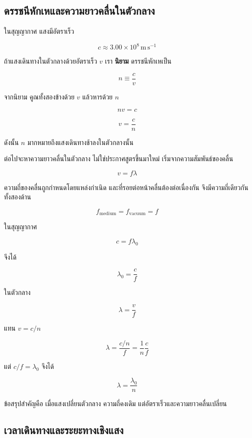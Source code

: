 \subsection{ดรรชนีหักเหและความยาวคลื่นในตัวกลาง}

ในสุญญากาศ แสงมีอัตราเร็ว

\[
c\approx 3.00\times10^8\,\mathrm{m\,s^{-1}}
\]

ถ้าแสงเดินทางในตัวกลางด้วยอัตราเร็ว $v$ เรา \textbf{นิยาม} ดรรชนีหักเหเป็น

\begin{tcolorbox}[title={นิยาม: ดรรชนีหักเห}]
\[
\boxed{n\equiv\frac{c}{v}}
\]
\end{tcolorbox}

จากนิยาม คูณทั้งสองข้างด้วย $v$ แล้วหารด้วย $n$

\[
nv=c
\]

\[
\boxed{v=\frac{c}{n}}
\]

ดังนั้น $n$ มากหมายถึงแสงเดินทางช้าลงในตัวกลางนั้น

ต่อไปจะหาความยาวคลื่นในตัวกลาง ไม่ใช่ประกาศสูตรขึ้นมาใหม่ เริ่มจากความสัมพันธ์ของคลื่น

\[
v=f\lambda
\]

ความถี่ของคลื่นถูกกำหนดโดยแหล่งกำเนิด และที่รอยต่อหน้าคลื่นต้องต่อเนื่องกัน จึงมีความถี่เดียวกันทั้งสองด้าน

\[
f_{\text{medium}}=f_{\text{vacuum}}=f
\]

ในสุญญากาศ

\[
c=f\lambda_0
\]

จึงได้

\[
\lambda_0=\frac{c}{f}
\]

ในตัวกลาง

\[
\lambda=\frac{v}{f}
\]

แทน $v=c/n$

\[
\lambda=\frac{c/n}{f}
=\frac{1}{n}\frac{c}{f}
\]

แต่ $c/f=\lambda_0$ จึงได้

\begin{tcolorbox}[title={ความยาวคลื่นในตัวกลาง}]
\[
\boxed{\lambda=\frac{\lambda_0}{n}}
\]
\end{tcolorbox}

ข้อสรุปสำคัญคือ เมื่อแสงเปลี่ยนตัวกลาง ความถี่คงเดิม แต่อัตราเร็วและความยาวคลื่นเปลี่ยน

\subsection{เวลาเดินทางและระยะทางเชิงแสง}

